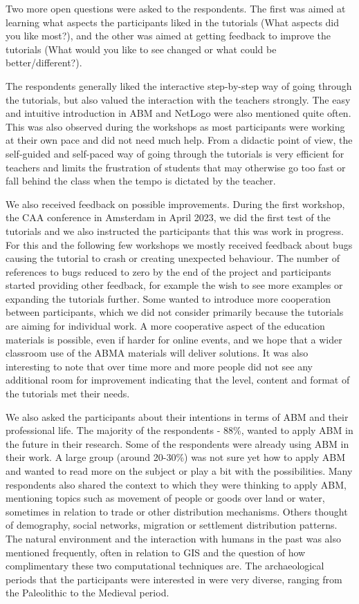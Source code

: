 \documentclass[
]{article}
\begin{document}
Two more open questions were asked to the respondents. The first was aimed at learning what aspects the participants liked in the tutorials (What aspects did you like most?), and the other was aimed at getting feedback to improve the tutorials (What would you like to see changed or what could be better/different?).

The respondents generally liked the interactive step-by-step way of going through the tutorials, but also valued the interaction with the teachers strongly. The easy and intuitive introduction in ABM and NetLogo were also mentioned quite often. This was also observed during the workshops as most participants were working at their own pace and did not need much help. From a didactic point of view, the self-guided and self-paced way of going through the tutorials is very efficient for teachers and limits the frustration of students that may otherwise go too fast or fall behind the class when the tempo is dictated by the teacher.

We also received feedback on possible improvements. During the first workshop, the CAA conference in Amsterdam in April 2023, we did the first test of the tutorials and we also instructed the participants that this was work in progress. For this and the following few workshops we mostly received feedback about bugs causing the tutorial to crash or creating unexpected behaviour. The number of references to bugs reduced to zero by the end of the project and participants started providing other feedback, for example the wish to see more examples or expanding the tutorials further. Some wanted to introduce more cooperation between participants, which we did not consider primarily because the tutorials are aiming for individual work. A more cooperative aspect of the education materials is possible, even if harder for online events, and we hope that a wider classroom use of the ABMA materials will deliver solutions. It was also interesting to note that over time more and more people did not see any additional room for improvement indicating that the level, content and format of the tutorials met their needs.

We also asked the participants about their intentions in terms of ABM and their professional life. The majority of the respondents - 88\%, wanted to apply ABM in the future in their research. Some of the respondents were already using ABM in their work. A large group (around 20-30\%) was not sure yet how to apply ABM and wanted to read more on the subject or play a bit with the possibilities. Many respondents also shared the context to which they were thinking to apply ABM, mentioning topics such as movement of people or goods over land or water, sometimes in relation to trade or other distribution mechanisms. Others thought of demography, social networks, migration or settlement distribution patterns. The natural environment and the interaction with humans in the past was also mentioned frequently, often in relation to GIS and the question of how complimentary these two computational techniques are. The archaeological periods that the participants were interested in were very diverse, ranging from the Paleolithic to the Medieval period.
\end{document}
